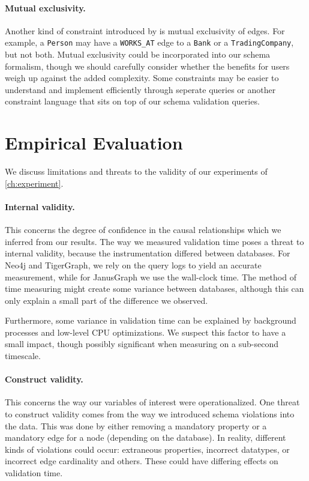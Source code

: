 \documentclass{report}
\theoremstyle{definition}
\begin{document}
\paragraph{Mutual exclusivity.} Another kind of constraint introduced by \citet{barker1990entity} is mutual exclusivity of edges. For example, a \texttt{Person} may have a \texttt{WORKS\_AT} edge to a \texttt{Bank} or a \texttt{TradingCompany}, but not both. Mutual exclusivity could be incorporated into our schema formalism, though we should carefully consider whether the benefits for users weigh up against the added complexity. Some constraints may be easier to understand and implement efficiently through seperate queries or another constraint language that sits on top of our schema validation queries.

\section{Empirical Evaluation}

We discuss limitations and threats to the validity of our experiments of \autoref{ch:experiment}.

\paragraph{Internal validity.} This concerns the degree of confidence in the causal relationships which we inferred from our results. The way we measured validation time poses a threat to internal validity, because the instrumentation differed between databases. For Neo4j and TigerGraph, we rely on the query logs to yield an accurate measurement, while for JanusGraph we use the wall-clock time. The method of time measuring might create some variance between databases, although this can only explain a small part of the difference we observed.

Furthermore, some variance in validation time can be explained by background processes and low-level CPU optimizations. We suspect this factor to have a small impact, though possibly significant when measuring on a sub-second timescale.

\paragraph{Construct validity.} This concerns the way our variables of interest were operationalized. One threat to construct validity comes from the way we introduced schema violations into the data. This was done by either removing a mandatory property or a mandatory edge for a node (depending on the database). In reality, different kinds of violations could occur: extraneous properties, incorrect datatypes, or incorrect edge cardinality and others. These could have differing effects on validation time.
\end{document}
